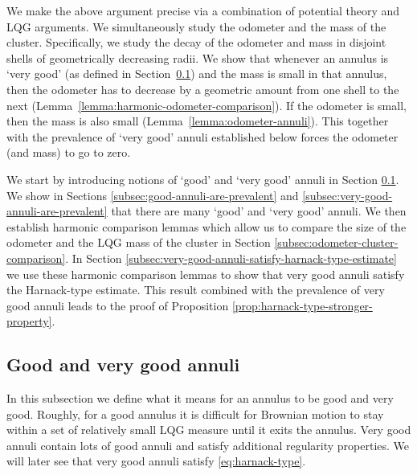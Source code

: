\documentclass[12pt]{amsart}
\numberwithin{equation}{section}
\begin{document}
	
	
	We make the above argument precise via a combination of potential theory and LQG arguments.
	We simultaneously study the odometer and the mass of the cluster. Specifically, we study the decay of the odometer and mass in disjoint shells of geometrically decreasing radii. We show that whenever an annulus is `very good' (as defined in Section~\ref{subsec:good-and-very-good-annuli}) and the mass is small in that annulus, then the odometer has to decrease by a geometric amount from one shell to the next (Lemma~\ref{lemma:harmonic-odometer-comparison}). If the odometer is small, then the mass is also small (Lemma~\ref{lemma:odometer-annuli}). This together with the prevalence of `very good' annuli established below forces the odometer (and mass) to go to zero. 
	
	We start by introducing notions of `good' and `very good' annuli
	in Section \ref{subsec:good-and-very-good-annuli}. We show in Sections \ref{subsec:good-annuli-are-prevalent}
	and \ref{subsec:very-good-annuli-are-prevalent} that there are many `good' and `very good' annuli.
	We then establish harmonic comparison lemmas which allow us to compare the size of the odometer and the LQG mass of the cluster
	in Section \ref{subsec:odometer-cluster-comparison}. In Section \ref{subsec:very-good-annuli-satisfy-harnack-type-estimate}
	we use these harmonic comparison lemmas to show that very good annuli satisfy the Harnack-type estimate. This result
	combined with the prevalence of very good annuli leads to the proof of Proposition \ref{prop:harnack-type-stronger-property}. 
	
	
	
	\subsection{Good and very good annuli} \label{subsec:good-and-very-good-annuli}
	
	In this subsection we define what it means for an annulus to be good and very good.  
	Roughly, for a good annulus it is difficult for Brownian motion to stay within a set 
	of relatively small LQG measure until it exits the annulus. Very good annuli
	contain lots of good annuli and satisfy additional regularity properties. 
	We will later see that very good annuli satisfy \eqref{eq:harnack-type}.  
	
\end{document}
